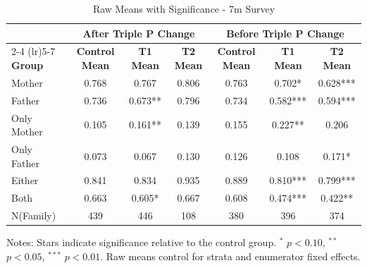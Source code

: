 \begin{table}[htbp]
\centering
\begin{threeparttable}
\caption{Raw Means with Significance  - 7m Survey}
\begin{tabular}{lcccccc}
\toprule
& \multicolumn{3}{c}{After Triple P Change} & \multicolumn{3}{c}{Before Triple P Change} \\
\cmidrule(lr){2-4} \cmidrule(lr){5-7}
\textbf{Group} & \textbf{Control Mean} & \textbf{T1 Mean} & \textbf{T2 Mean} & \textbf{Control Mean} & \textbf{T1 Mean} & \textbf{T2 Mean} \\
\midrule
Mother &  0.768 &  0.767 &  0.806 &   0.763 &  0.702* &  0.628*** \\
Father &  0.736 &  0.673** &  0.796 & 0.734 &  0.582*** &  0.594*** \\
Only Mother &  0.105 &  0.161** &  0.139 & 0.155 &  0.227** &  0.206 \\
Only Father &  0.073 &  0.067 &  0.130 &  0.126 &  0.108 &  0.171* \\
Either &  0.841 &  0.834 &  0.935 & 0.889 &  0.810*** &  0.799*** \\
Both &  0.663 &  0.605* &  0.667 & 0.608 &  0.474*** &  0.422** \\
N(Family) & 439 & 446 & 108  & 380 & 396 & 374 \\
\bottomrule
\end{tabular}
\begin{tablenotes}
\small
Notes: Stars indicate significance relative to the control group. 
$^{*}$ $p<0.10$, $^{**}$ $p<0.05$, $^{***}$ $p<0.01$.
Raw means control for strata and enumerator fixed effects.
\end{tablenotes}
\end{threeparttable}
\end{table}

